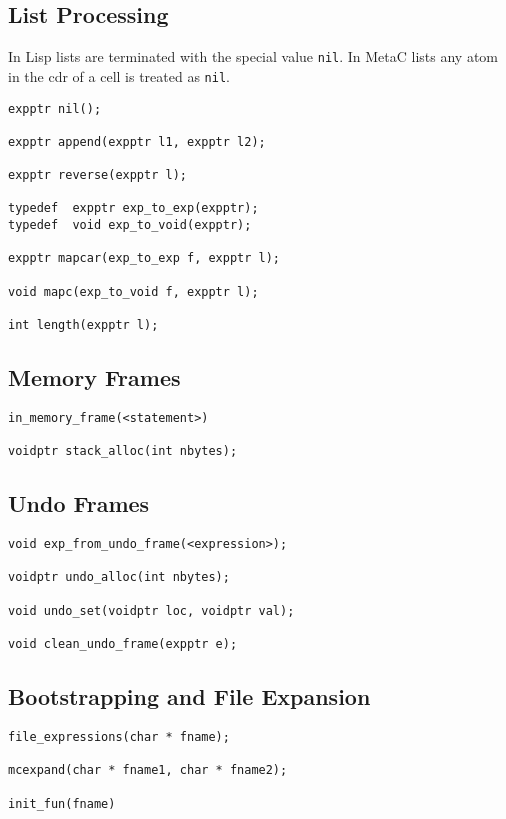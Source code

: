 \documentclass{article}
\begin{document}
\subsection{List Processing}

In Lisp lists are terminated with the special value {\tt nil}.  In MetaC lists any atom in the
cdr of a cell is treated as {\tt nil}.

\begin{verbatim}
expptr nil();

expptr append(expptr l1, expptr l2);

expptr reverse(expptr l);

typedef  expptr exp_to_exp(expptr);
typedef  void exp_to_void(expptr);

expptr mapcar(exp_to_exp f, expptr l);

void mapc(exp_to_void f, expptr l);

int length(expptr l);
\end{verbatim}

\subsection{Memory Frames}

\begin{verbatim}
in_memory_frame(<statement>)

voidptr stack_alloc(int nbytes);
\end{verbatim}

\subsection{Undo Frames}

\begin{verbatim}
void exp_from_undo_frame(<expression>);

voidptr undo_alloc(int nbytes);

void undo_set(voidptr loc, voidptr val);

void clean_undo_frame(expptr e);
\end{verbatim}

\subsection{Bootstrapping and File Expansion}

\begin{verbatim}
file_expressions(char * fname);

mcexpand(char * fname1, char * fname2);

init_fun(fname)
\end{verbatim}




\end{document}
